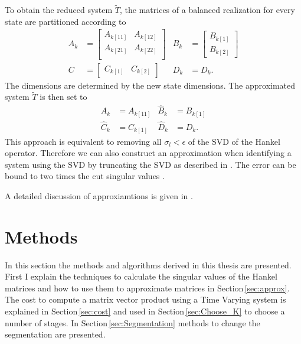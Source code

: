 \documentclass[doctype=mastersthesis,BCOR=15mm,biblatex]{ldvbook}%
\begin{document}
To obtain the reduced system $\tilde{T}$, the matrices of a balanced realization for every state are partitioned according to
\begin{subequations}\label{eq:segmented_system}
\begin{align}
	A_k &=\begin{bmatrix}
	A_{k[11]} & A_{k[12]} \\
	A_{k[21]} & A_{k[22]} \\
	\end{bmatrix}
	&
	B_k &= \begin{bmatrix}
	B_{k[1]} \\ B_{k[2]}
	\end{bmatrix} 
	\\
	C &= \begin{bmatrix}
	C_{k[1]} & C_{k[2]}
	\end{bmatrix}& 
	D_k&=D_k.
\end{align}
\end{subequations}
The dimensions are determined by the new state dimensions.
The approximated system $\tilde{T}$ is then set to
\begin{subequations}
\begin{align}\label{eq:reduced_system}
	\hat{A}_k &= A_{k[11]}  & \hat{B}_k &= B_{k[1]}\\
	\hat{C}_k &=C_{k[1]}      & \hat{D}_k &= D_k.
\end{align}
\end{subequations}
This approach is equivalent to removing all $\sigma_l<\epsilon$ of the SVD of the Hankel operator.
Therefore we can also construct an approximation when identifying a system using the SVD by truncating the SVD as described in \cite{shokoohi_identification_1987}.
The error can be bound to two times the cut singular values \cite{lall_error-bounds_2003}.

A detailed discussion of approxiamtions is given in
\cite{antoulas_approximation_2005}.

\chapter{Methods} 
In this section the methods and algorithms derived in this thesis are presented.
First I explain the techniques to calculate the singular values of the Hankel matrices and how to use them to approximate matrices in Section\,\ref{sec:approx}.
The cost to compute a matrix vector product using a Time Varying system is explained in Section\,\ref{sec:cost} and used in Section\,\ref{sec:Choose_K} to choose a number of stages. 
In Section\,\ref{sec:Segmentation} methods to change the segmentation are presented.
\end{document}
